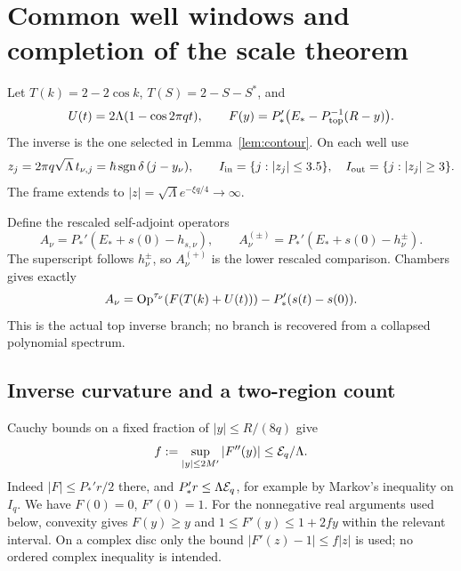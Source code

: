 \section{Common well windows and completion of the scale theorem}\label{app:comparison}
Let $T(k)=2-2\cos k$, $T(S)=2-S-S^*$, and
\[
 U(t)=2\Lambda(1-\cos2\pi qt),\qquad
 F(y)=P_*'\bigl(E_*-P_{\rm top}^{-1}(R-y)\bigr).
\]
The inverse is the one selected in Lemma~\ref{lem:contour}. On each well use
\[
 z_j=2\pi q\sqrt\Lambda\,t_{\nu,j}
     =\hbar\operatorname{sgn}\delta\,(j-y_\nu),\qquad
 I_{\rm in}=\{j:|z_j|\le3.5\},\quad I_{\rm out}=\{j:|z_j|\ge3\}.
\]
The frame extends to $|z|=\sqrt\Lambda e^{-\xi q/4}\to\infty$.

Define the rescaled self-adjoint operators
\begin{equation}\label{eq:Aoperators}
 A_\nu=P_*'(E_*+s(0)-h_{s,\nu}),\qquad
 A_\nu^{(\pm)}=P_*'(E_*+s(0)-h_\nu^\pm).
\end{equation}
The superscript follows $h_\nu^\pm$, so $A_\nu^{(+)}$ is the lower rescaled comparison. Chambers gives exactly
\begin{equation}\label{eq:Asymbol}
 A_\nu=\operatorname{Op}^{\tau_\nu}(F(T(k)+U(t)))
                    -P_*'(s(t)-s(0)).
\end{equation}
This is the actual top inverse branch; no branch is recovered from a collapsed polynomial spectrum.

\subsection{Inverse curvature and a two-region count}
Cauchy bounds on a fixed fraction of $|y|\le R/(8q)$ give
\begin{equation}\label{eq:fcurvature}
 f:=\sup_{|y|\le2M'}|F''(y)|\le\mathcal E_q/\Lambda.
\end{equation}
Indeed $|F|\le P_*'r/2$ there, and $P_*'r\le\Lambda\mathcal E_q$, for example by Markov's inequality on $I_q$. We have $F(0)=0$, $F'(0)=1$. For the nonnegative real arguments used below, convexity gives $F(y)\ge y$ and $1\le F'(y)\le1+2fy$ within the relevant interval. On a complex disc only the bound $|F'(z)-1|\le f|z|$ is used; no ordered complex inequality is intended.

